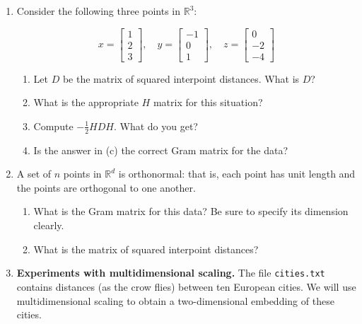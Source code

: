 \documentclass{article}
\begin{document}
\begin{enumerate}
\item Consider the following three points in $\mathbb{R}^3$:

\[
x = \begin{bmatrix}1 \\ 2 \\ 3\end{bmatrix}, \quad
y = \begin{bmatrix}-1 \\ 0 \\ 1\end{bmatrix}, \quad
z = \begin{bmatrix}0 \\ -2 \\ -4\end{bmatrix}
\]

\begin{enumerate}
\item Let $D$ be the matrix of squared interpoint distances. What is $D$?

\item What is the appropriate $H$ matrix for this situation?

\item Compute $-\frac{1}{2}HDH$. What do you get?

\item Is the answer in (c) the correct Gram matrix for the data?
\end{enumerate}

\item A set of $n$ points in $\mathbb{R}^d$ is orthonormal: that is, each point has unit length and the points are orthogonal to one another.

\begin{enumerate}
\item What is the Gram matrix for this data? Be sure to specify its dimension clearly.

\item What is the matrix of squared interpoint distances?
\end{enumerate}

\item \textbf{Experiments with multidimensional scaling.} The file \texttt{cities.txt} contains distances (as the crow flies) between ten European cities. We will use multidimensional scaling to obtain a two-dimensional embedding of these cities.


\end{enumerate}
\end{document}
